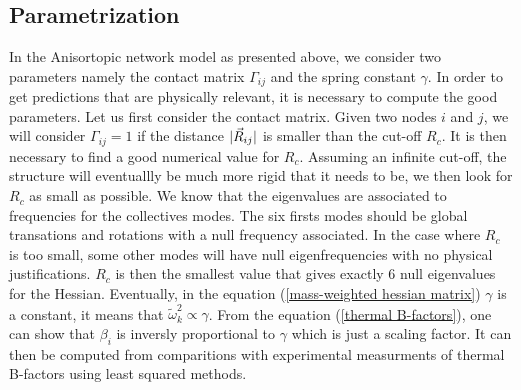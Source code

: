 \subsection{Parametrization}
In the Anisortopic network model as presented above, we consider two parameters namely the contact matrix $\Gamma_{ij}$ and the spring constant $\gamma$. In order to get predictions that are physically relevant, it is necessary to compute the good parameters. Let us first consider the contact matrix. Given two nodes $i$ and $j$, we will consider $\Gamma_{ij} = 1$ if the distance $\vert\vec{R}_{ij}\vert$ is smaller than the cut-off $R_c$. It is then necessary to find a good numerical value for $R_c$. Assuming an infinite cut-off, the structure will eventuallly be much more rigid that it needs to be, we then look for $R_c$ as small as possible. We know that the eigenvalues are associated to frequencies for the collectives modes. The six firsts modes should be global transations and rotations with a null frequency associated. In the case where $R_c$ is too small, some other modes will have null eigenfrequencies with no physical justifications. $R_c$ is then the smallest value that gives exactly $6$ null eigenvalues for the Hessian. Eventually, in the equation (\ref{mass-weighted hessian matrix}) $\gamma$ is a constant, it means that $\tilde{\omega}_k^2 \propto \gamma$. From the equation (\ref{thermal B-factors}), one can show that $\beta_i$ is inversly proportional to $\gamma$ which is just a scaling factor. It can then be computed from comparitions with experimental measurments of thermal B-factors using least squared methods.


